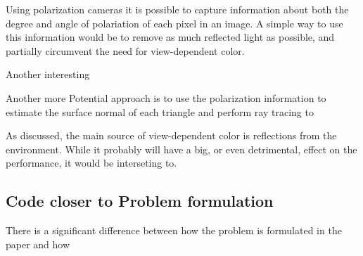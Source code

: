 Using polarization cameras it is possible to capture information about both the degree and angle of polariation of each pixel in an image.
A simple way to use this information would be to remove as much reflected light as possible, and partially circumvent the need for view-dependent color.

Another interesting


Another more Potential approach is to use the polarization information to estimate the surface normal of each triangle and perform ray tracing to

As discussed, the main source of view-dependent color is reflections from the environment.
While it probably will have a big, or even detrimental, effect on the performance, it would be interseting to.




\subsection{Code closer to Problem formulation}
There is a significant difference between how the problem is formulated in the paper and how
